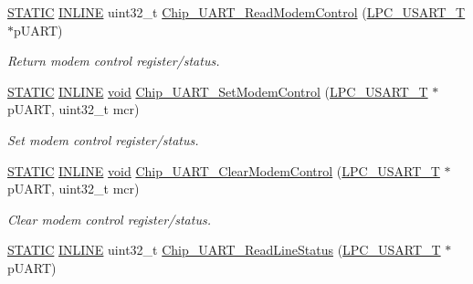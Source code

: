 \begin{DoxyCompactItemize}
\hyperlink{group__LPC__Types__Public__Macros_ga10b2d890d871e1489bb02b7e70d9bdfb}{S\-T\-A\-T\-I\-C} \hyperlink{group__LPC__Types__Public__Types_ga2eb6f9e0395b47b8d5e3eeae4fe0c116}{I\-N\-L\-I\-N\-E} uint32\-\_\-t \hyperlink{group__UART__17XX__40XX_gadef0e0d2ea30182cd99561efe9909707}{Chip\-\_\-\-U\-A\-R\-T\-\_\-\-Read\-Modem\-Control} (\hyperlink{structLPC__USART__T}{L\-P\-C\-\_\-\-U\-S\-A\-R\-T\-\_\-\-T} $\ast$p\-U\-A\-R\-T)
\begin{DoxyCompactList}\small\item\em Return modem control register/status. \end{DoxyCompactList}\item 
\hyperlink{group__LPC__Types__Public__Macros_ga10b2d890d871e1489bb02b7e70d9bdfb}{S\-T\-A\-T\-I\-C} \hyperlink{group__LPC__Types__Public__Types_ga2eb6f9e0395b47b8d5e3eeae4fe0c116}{I\-N\-L\-I\-N\-E} \hyperlink{Paradigm_2Tern__EE_2small_2portmacro_8h_a14d32f8130d3c0b212cfc751730b5b49}{void} \hyperlink{group__UART__17XX__40XX_gad617968b795061ad0e4578aa79c4537d}{Chip\-\_\-\-U\-A\-R\-T\-\_\-\-Set\-Modem\-Control} (\hyperlink{structLPC__USART__T}{L\-P\-C\-\_\-\-U\-S\-A\-R\-T\-\_\-\-T} $\ast$p\-U\-A\-R\-T, uint32\-\_\-t mcr)
\begin{DoxyCompactList}\small\item\em Set modem control register/status. \end{DoxyCompactList}\item 
\hyperlink{group__LPC__Types__Public__Macros_ga10b2d890d871e1489bb02b7e70d9bdfb}{S\-T\-A\-T\-I\-C} \hyperlink{group__LPC__Types__Public__Types_ga2eb6f9e0395b47b8d5e3eeae4fe0c116}{I\-N\-L\-I\-N\-E} \hyperlink{Paradigm_2Tern__EE_2small_2portmacro_8h_a14d32f8130d3c0b212cfc751730b5b49}{void} \hyperlink{group__UART__17XX__40XX_gabdcefa8f847cfa0de2f9292405827874}{Chip\-\_\-\-U\-A\-R\-T\-\_\-\-Clear\-Modem\-Control} (\hyperlink{structLPC__USART__T}{L\-P\-C\-\_\-\-U\-S\-A\-R\-T\-\_\-\-T} $\ast$p\-U\-A\-R\-T, uint32\-\_\-t mcr)
\begin{DoxyCompactList}\small\item\em Clear modem control register/status. \end{DoxyCompactList}\item 
\hyperlink{group__LPC__Types__Public__Macros_ga10b2d890d871e1489bb02b7e70d9bdfb}{S\-T\-A\-T\-I\-C} \hyperlink{group__LPC__Types__Public__Types_ga2eb6f9e0395b47b8d5e3eeae4fe0c116}{I\-N\-L\-I\-N\-E} uint32\-\_\-t \hyperlink{group__UART__17XX__40XX_gaf15ab7a9529d102b91760ed5587b279a}{Chip\-\_\-\-U\-A\-R\-T\-\_\-\-Read\-Line\-Status} (\hyperlink{structLPC__USART__T}{L\-P\-C\-\_\-\-U\-S\-A\-R\-T\-\_\-\-T} $\ast$p\-U\-A\-R\-T)

\end{DoxyCompactItemize}
